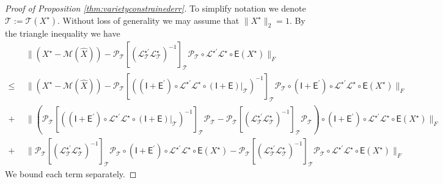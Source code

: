 \documentclass[11pt,letterpaper]{article}
\newcommand{\ct}{\mathcal{T}}
\newcommand{\cp}{\mathcal{P}}
\newcommand{\sfe}{\mathsf{E}}
\newcommand{\sfi}{\mathsf{I}}
\begin{document}
\begin{proof}[Proof of Proposition \ref{thm:varietyconstrainederr}]
	To simplify notation we denote $\ct:=\ct(X^{\star})$.  Without loss of generality we may assume that $\|X^{\star}\|_2=1$.  By the triangle inequality we have
	\begin{align*}
		& ~~ \| (X^{\star} - \mathcal{M}(\hat{X})) - \cp_{\ct}[(\mathcal{L}^{\star\prime}_{\ct} \mathcal{L}^{\star}_{\ct})^{-1}]_{\ct} \cp_{\ct} \circ \mathcal{L}^{\star\prime} \mathcal{L}^{\star} \circ \sfe (X^{\star}) \|_F \\
		\leq & ~~ \| (X^{\star} - \mathcal{M}(\hat{X})) - \cp_{\ct} [( (\sfi+\sfe^{\prime}) \circ \mathcal{L}^{\star\prime} \mathcal{L}^{\star} \circ (\sfi+\sfe) |_{\ct} )^{-1}]_{\ct} \cp_{\ct} \circ (\sfi+\sfe^{\prime}) \circ \mathcal{L}^{\star\prime} \mathcal{L}^{\star} \circ \sfe (X^{\star}) \|_F \\
		+ & ~~ \| (\cp_{\ct} [((\sfi+\sfe^{\prime}) \circ \mathcal{L}^{\star\prime} \mathcal{L}^{\star} \circ (\sfi+\sfe)|_{\ct} )^{-1}]_{\ct} \cp_{\ct} - \cp_{\ct} [(\mathcal{L}^{\star\prime}_{\ct} \mathcal{L}^{\star}_{\ct} )^{-1}]_{\ct} \cp_{\ct} ) \circ (\sfi+\sfe^{\prime}) \circ \mathcal{L}^{\star\prime} \mathcal{L}^{\star} \circ \sfe (X^{\star}) \|_F \\
		+ & ~~ \| \cp_{\ct} [(\mathcal{L}^{\star\prime}_{\ct} \mathcal{L}^{\star}_{\ct} )^{-1}]_{\ct} \cp_{\ct} \circ (\sfi+\sfe^{\prime}) \circ \mathcal{L}^{\star\prime} \mathcal{L}^{\star} \circ \sfe (X^{\star}) - \cp_{\ct} [(\mathcal{L}^{\star\prime}_{\ct} \mathcal{L}^{\star}_{\ct} )^{-1}]_{\ct} \cp_{\ct} \circ \mathcal{L}^{\star\prime} \mathcal{L}^{\star} \circ \sfe (X^{\star}) \|_F
	\end{align*}
	We bound each term separately.
	

\end{proof}
\end{document}
